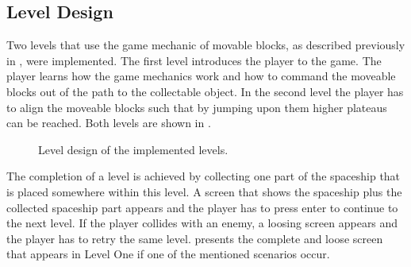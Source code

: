 \subsection{Level Design}\label{sec:game_design_level}
Two levels that use the game mechanic of movable blocks, as described previously in , were implemented.
The first level introduces the player to the game.
The player learns how the game mechanics work and how to command the moveable blocks out of the path to the collectable object.
In the second level the player has to align the moveable blocks such that by jumping upon them higher plateaus can be reached.
Both levels are shown in .
\begin{figure}[!ht]
  \centering
  \quad
  \caption{Level design of the implemented levels.}
  \label{fig:game_design_level}
\end{figure}
\FloatBarrier
\noindent
The completion of a level is achieved by collecting one part of the spaceship that is placed somewhere within this level.
A screen that shows the spaceship plus the collected spaceship part appears and the player has to press enter to continue to the next level.
If the player collides with an enemy, a loosing screen appears and the player has to retry the same level.
 presents the complete and loose screen that appears in Level One if one of the mentioned scenarios occur.
